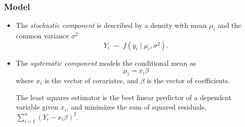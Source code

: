 \begin{enumerate}

\end{center}

\end{enumerate}

\subsubsection{Model}
\begin{itemize}
\item The \emph{stochastic component} is described by a density
  with mean $\mu_i$ and the common variance $\sigma^2$
  \begin{equation*}
    Y_i \; \sim \; f(y_i \mid \mu_i, \sigma^2).
  \end{equation*}
\item The \emph{systematic component} models the conditional mean as
  \begin{equation*}
     \mu_i =  x_i \beta
  \end{equation*} 
  where $x_i$ is the vector of covariates, and $\beta$ is the vector
  of coefficients.
  
  The least squares estimator is the best linear predictor of a
  dependent variable given $x_i$, and minimizes the sum of squared
  residuals, $\sum_{i=1}^n (Y_i-x_i \beta)^2$.  
\end{itemize}

